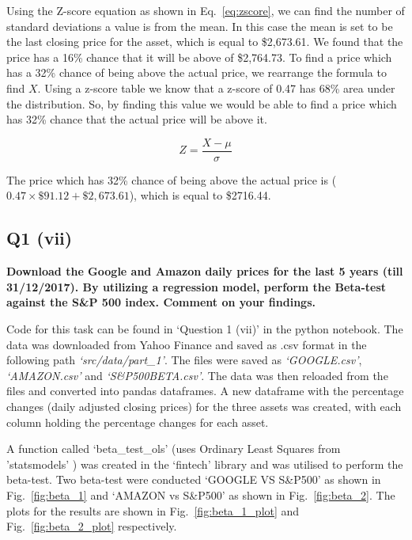 \noindent
Using the Z-score equation as shown in Eq.~\ref{eq:zscore}, we can find the number of standard deviations a value is from the mean. In this case the mean is set to be the last closing price for the asset, which is equal to \$2,673.61. We found that the price has a 16\% chance that it will be above of \$2,764.73. To find a price which has a 32\% chance of being above the actual price, we rearrange the formula to find $X$. Using a z-score table we know that a z-score of 0.47 has 68\% area under the distribution. So, by finding this value we would be able to find a price which has 32\% chance that the actual price will be above it. 

\begin{equation} \label{eq:zscore}
    Z = \frac{X - \mu}{\sigma}
\end{equation}

\noindent
The price which has 32\% chance of being above the actual price is ($0.47 \times \$91.12 + \$2,673.61$), which is equal to \$2716.44.



\subsection{Q1 (vii)}\label{sssec:pt1q1vii}

\textbf{Download the Google and Amazon daily prices for the last 5 years (till 31/12/2017). By utilizing a
regression model, perform the Beta-test against the S\&P 500 index. Comment on your findings.}

\noindent
Code for this task can be found in ‘Question 1 (vii)’ in the python notebook. The data was downloaded from Yahoo Finance and saved as .csv format in the following path \textit{‘src/data/part\_1’}. The files were saved as \textit{‘GOOGLE.csv’}, \textit{‘AMAZON.csv’} and \textit{‘S\&P500BETA.csv’}. The data was then reloaded from the files and converted into pandas dataframes. A new dataframe with the percentage changes (daily adjusted closing prices) for the three assets was created, with each column holding the percentage changes for each asset.

\noindent
A function called ‘beta\_test\_ols’ (uses Ordinary Least Squares from 'statsmodels' \cite{seabold2010statsmodels}) was created in the ‘fintech’ library and was utilised to perform the beta-test. Two beta-test were conducted ‘GOOGLE VS S\&P500’ as shown in Fig.~\ref{fig:beta_1} and ‘AMAZON vs S\&P500’ as shown in Fig.~\ref{fig:beta_2}. The plots for the results are shown in Fig.~\ref{fig:beta_1_plot} and Fig.~\ref{fig:beta_2_plot} respectively.  

